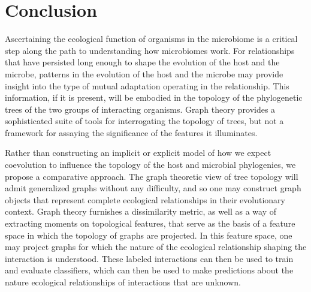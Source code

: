 \section{Conclusion}



Ascertaining the ecological function of organisms in the microbiome is a critical step along the path to understanding how microbiomes work. For relationships that have persisted long enough to shape the evolution of the host and the microbe, patterns in the evolution of the host and the microbe may provide insight into the type of mutual adaptation operating in the relationship. This information, if it is present, will be embodied in the topology of the phylogenetic trees of the two groups of interacting organisms. Graph theory provides a sophisticated suite of tools for interrogating the topology of trees, but not a framework for assaying the significance of the features it illuminates. 

Rather than constructing an implicit or explicit model of how we expect coevolution to influence the topology of the host and microbial phylogenies, we propose a comparative approach. The graph theoretic view of tree topology will admit generalized graphs without any difficulty, and so one may construct graph objects that represent complete ecological relationships in their evolutionary context. Graph theory furnishes a dissimilarity metric, as well as a way of extracting moments on topological features, that serve as the basis of a feature space in which the topology of graphs are projected. In this feature space, one may project graphs for which the nature of the ecological relationship shaping the interaction is understood. These labeled interactions can then be used to train and evaluate classifiers, which can then be used to make predictions about the nature ecological relationships of interactions that are unknown.

